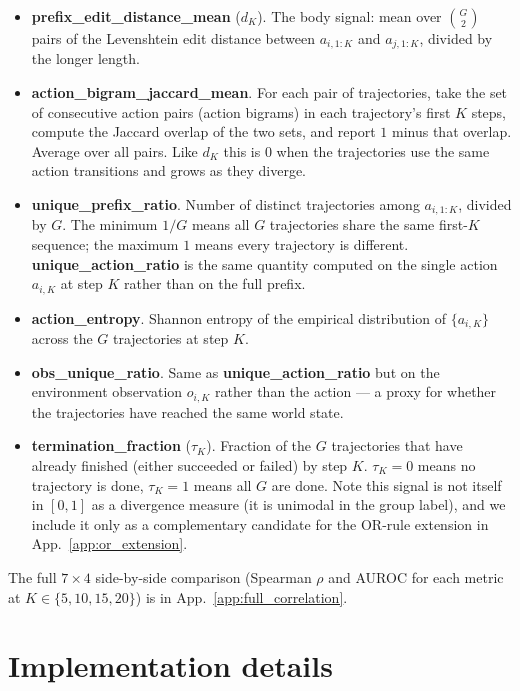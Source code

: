 \documentclass{article}
\begin{document}
\begin{itemize}[leftmargin=*,topsep=0pt,itemsep=2pt]
\item \textbf{prefix\_edit\_distance\_mean} ($d_K$). The body
signal: mean over $\binom{G}{2}$ pairs of the Levenshtein edit
distance between $a_{i, 1:K}$ and $a_{j, 1:K}$, divided by the
longer length.
\item \textbf{action\_bigram\_jaccard\_mean}. For each pair of
trajectories, take the set of consecutive action pairs (action
bigrams) in each trajectory's first $K$ steps, compute the Jaccard
overlap of the two sets, and report $1$ minus that overlap.
Average over all pairs. Like $d_K$ this is $0$ when the
trajectories use the same action transitions and grows as they
diverge.
\item \textbf{unique\_prefix\_ratio}. Number of distinct
trajectories among $a_{i, 1:K}$, divided by $G$. The minimum
$1/G$ means all $G$ trajectories share the same first-$K$
sequence; the maximum $1$ means every trajectory is different.
\textbf{unique\_action\_ratio} is the same quantity computed on
the single action $a_{i, K}$ at step $K$ rather than on the full
prefix.
\item \textbf{action\_entropy}. Shannon entropy of the empirical
distribution of $\{a_{i, K}\}$ across the $G$ trajectories at
step $K$.
\item \textbf{obs\_unique\_ratio}. Same as
\textbf{unique\_action\_ratio} but on the environment observation
$o_{i, K}$ rather than the action --- a proxy for whether the
trajectories have reached the same world state.
\item \textbf{termination\_fraction} ($\tau_K$). Fraction of the
$G$ trajectories that have already finished (either succeeded or
failed) by step $K$. $\tau_K\!=\!0$ means no trajectory is done,
$\tau_K\!=\!1$ means all $G$ are done. Note this signal is not
itself in $[0, 1]$ as a divergence measure (it is unimodal in the
group label), and we include it only as a complementary candidate
for the OR-rule extension in App.~\ref{app:or_extension}.
\end{itemize}

The full $7\!\times\!4$ side-by-side comparison
(Spearman $\rho$ and AUROC for each metric at
$K\!\in\!\{5, 10, 15, 20\}$) is in
App.~\ref{app:full_correlation}.


\section{Implementation details}
\label{app:impl}
\end{document}
